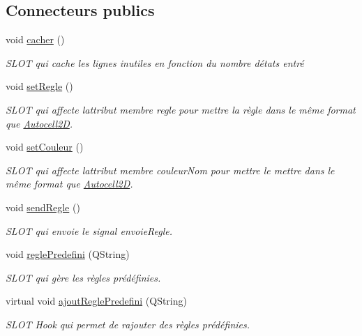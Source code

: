 \subsection*{Connecteurs publics}
\begin{DoxyCompactItemize}
\item 
void \hyperlink{class_regle2_d_a832501bff71ae1739d7936caee265477}{cacher} ()
\begin{DoxyCompactList}\small\item\em S\+L\+OT qui cache les lignes inutiles en fonction du nombre d\textquotesingle{}états entré \end{DoxyCompactList}\item 
void \hyperlink{class_regle2_d_ab66521625d0ff29d5928d65b1d62b14e}{set\+Regle} ()
\begin{DoxyCompactList}\small\item\em S\+L\+OT qui affecte l\textquotesingle{}attribut membre regle pour mettre la règle dans le même format que \hyperlink{class_autocell2_d}{Autocell2D}. \end{DoxyCompactList}\item 
void \hyperlink{class_regle2_d_a9147d46c674a80a5ef969a2b7f9ad9bc}{set\+Couleur} ()
\begin{DoxyCompactList}\small\item\em S\+L\+OT qui affecte l\textquotesingle{}attribut membre couleur\+Nom pour mettre le mettre dans le même format que \hyperlink{class_autocell2_d}{Autocell2D}. \end{DoxyCompactList}\item 
void \hyperlink{class_regle2_d_a1958192093ce058d829ffc77cfa8ee78}{send\+Regle} ()
\begin{DoxyCompactList}\small\item\em S\+L\+OT qui envoie le signal envoie\+Regle. \end{DoxyCompactList}\item 
void \hyperlink{class_regle2_d_aa096e82f85ef2cfa78bf6784b5dda448}{regle\+Predefini} (Q\+String)
\begin{DoxyCompactList}\small\item\em S\+L\+OT qui gère les règles prédéfinies. \end{DoxyCompactList}\item 
virtual void \hyperlink{class_regle2_d_ad53e81ccd6fa9eb94d30d87dca19a213}{ajout\+Regle\+Predefini} (Q\+String)
\begin{DoxyCompactList}\small\item\em S\+L\+OT Hook qui permet de rajouter des règles prédéfinies. \end{DoxyCompactList}\item 

\end{DoxyCompactItemize}
